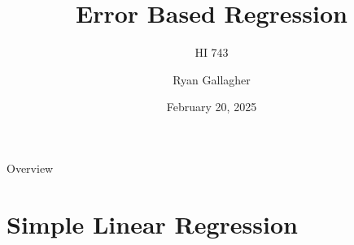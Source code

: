 \documentclass[aspectratio=169,xcolor=dvipsnames]{beamer}
\title{Error Based Regression}
\subtitle{HI 743}
\author{Ryan Gallagher}
\institute
{
    Department of Health Informatics and Administration \\
    Zilber College of Public Health \\
    University of Wisconsin - Milwaukee%
}
\date{February 20, 2025} %
\begin{document}
\begin{frame}
    \titlepage
\end{frame}


\begin{frame}{Overview}
    \tableofcontents
\end{frame}

\section{Simple Linear Regression}
\end{document}
